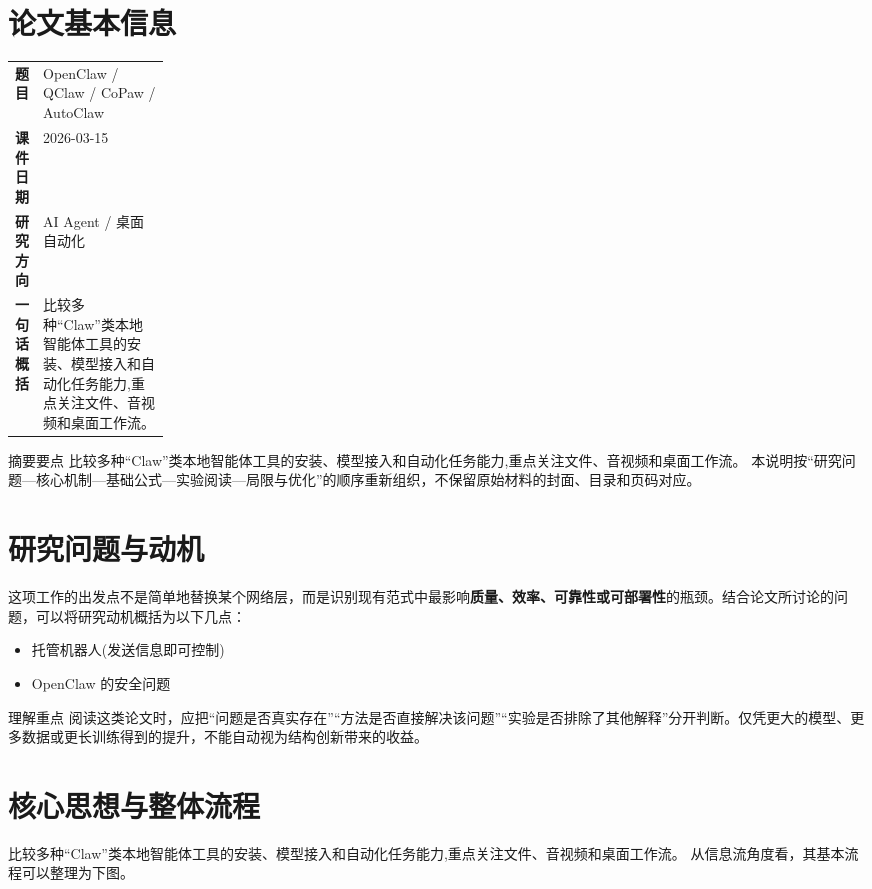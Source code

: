 \documentclass[UTF8,11pt,a4paper]{ctexart}
\newcommand{\term}[1]{\textbf{\textcolor{mainblue}{#1}}}
\begin{document}
\section{论文基本信息}
\begin{center}
\begin{tabularx}{0.94\linewidth}{>{\bfseries}p{0.18\linewidth}X}
\toprule
题目 & OpenClaw / QClaw / CoPaw / AutoClaw\\
课件日期 & 2026-03-15\\
研究方向 & AI Agent / 桌面自动化\\
一句话概括 & 比较多种“Claw”类本地智能体工具的安装、模型接入和自动化任务能力,重点关注文件、音视频和桌面工作流。\\
\bottomrule
\end{tabularx}
\end{center}

\begin{infobox}{摘要要点}
比较多种“Claw”类本地智能体工具的安装、模型接入和自动化任务能力,重点关注文件、音视频和桌面工作流。 本说明按“研究问题—核心机制—基础公式—实验阅读—局限与优化”的顺序重新组织，不保留原始材料的封面、目录和页码对应。
\end{infobox}

\section{研究问题与动机}
这项工作的出发点不是简单地替换某个网络层，而是识别现有范式中最影响\term{质量、效率、可靠性或可部署性}的瓶颈。结合论文所讨论的问题，可以将研究动机概括为以下几点：
\begin{itemize}
\item 托管机器人(发送信息即可控制)
\item OpenClaw 的安全问题
\end{itemize}

\begin{notebox}{理解重点}
阅读这类论文时，应把“问题是否真实存在”“方法是否直接解决该问题”“实验是否排除了其他解释”分开判断。仅凭更大的模型、更多数据或更长训练得到的提升，不能自动视为结构创新带来的收益。
\end{notebox}

\section{核心思想与整体流程}
比较多种“Claw”类本地智能体工具的安装、模型接入和自动化任务能力,重点关注文件、音视频和桌面工作流。 从信息流角度看，其基本流程可以整理为下图。
\end{document}
